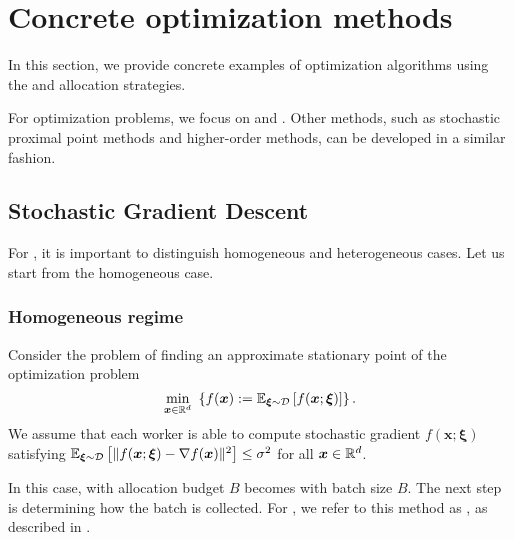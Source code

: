 \section{Concrete optimization methods}
\label{section:other_methods}

In this section, we provide concrete examples of optimization algorithms using the  and  allocation strategies.

For optimization problems, we focus on  and .
Other methods, such as stochastic proximal point methods and higher-order methods, can be developed in a similar fashion.

\subsection{Stochastic Gradient Descent}

For , it is important to distinguish homogeneous and heterogeneous cases.
Let us start from the homogeneous case.

\subsubsection{Homogeneous regime}

Consider the problem of finding an approximate stationary point of the optimization problem
\begin{equation}
    \label{eq:homo_problem}
    \min_{\bm{x} \in \mathbb{R}^d} \ \left\{f(\bm{x}) := {\mathbb{E}}_{\bm{\xi} \sim {\cal D}}\left[f(\bm{x};\bm{\xi})\right]\right\}.
\end{equation}
We assume that each worker is able to compute stochastic gradient $f(\bm{x};\bm{\xi})$ satisfying $\mathbb{E}_{\bm{\xi} \sim {\cal D}}\left[ \|f(\bm{x};\bm{\xi}) - \nabla f(\bm{x})\|^2\right] \leq \sigma^2$ for all $\bm{x}\in \mathbb{R}^d$.

In this case,  with allocation budget $B$ becomes  with batch size $B$. The next step is determining how the batch is collected. For , we refer to this method as , as described in .

